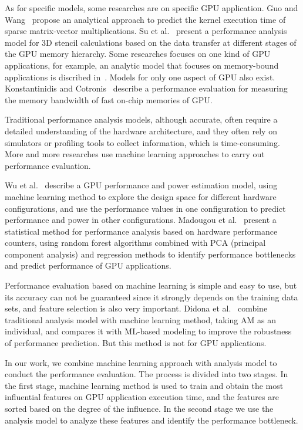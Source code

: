As for specific models, some researches are on specific GPU application. Guo and Wang~\cite{Guo2015Accurate} propose an analytical approach to predict the kernel execution time of sparse matrix-vector multiplications. Su et al.~\cite{Su2015An} present a performance analysis model for 3D stencil calculations based on the data transfer at different stages of the GPU memory hierarchy. Some researches focuses on one kind of GPU applications, for example, an analytic model that focuses on memory-bound applications is discribed in~\cite{Ma2012A}. Models for only one aspect of GPU also exist. Konstantinidis and Cotronis~\cite{Konstantinidis2016A} describe a performance evaluation for measuring the memory bandwidth of fast on-chip memories of GPU.

Traditional performance analysis models, although accurate, often require a detailed understanding of the hardware architecture, and they often rely on simulators or profiling tools to collect information, which is time-consuming. More and more researches use machine learning approaches to carry out performance evaluation.

Wu et al.~\cite{Wu2015GPGPU} describe a GPU performance and power estimation model, using machine learning method to explore the design space for different hardware configurations, and use the performance values in one configuration to predict performance and power in other configurations. Madougou et al.~\cite{Madougou2016A} present a statistical method for performance analysis based on hardware performance counters, using random forest algorithms combined with PCA (principal component analysis) and regression methods to identify performance bottlenecks and predict performance of GPU applications.

Performance evaluation based on machine learning is simple and easy to use, but its accuracy can not be guaranteed since it strongly depends on the training data sets, and feature selection is also very important. Didona et al.~\cite{Didona2015Enhancing} combine traditional analysis model with machine learning method, taking AM as an individual, and compares it with ML-based modeling to improve the robustness of performance prediction. But this method is not for GPU applications.

In our work, we combine machine learning approach with analysis model to conduct the performance evaluation. The process is divided into two stages. In the first stage, machine learning method is used to train and obtain the most influential features on GPU application execution time, and the features are sorted based on the degree of the influence. In the second stage we use the analysis model to analyze these features and identify the performance bottleneck.

